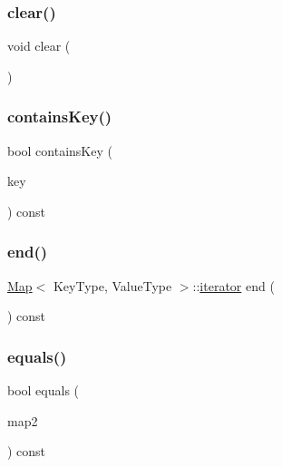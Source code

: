 \mbox{\label{classMap_ac8bb3912a3ce86b15842e79d0b421204}} 
\subsubsection{\texorpdfstring{clear()}{clear()}}
{\footnotesize\ttfamily void clear (\begin{DoxyParamCaption}{ }\end{DoxyParamCaption})}

\mbox{\label{classMap_a37473445b6725c5f0fc59a32ea2e645e}} 
\subsubsection{\texorpdfstring{contains\+Key()}{containsKey()}}
{\footnotesize\ttfamily bool contains\+Key (\begin{DoxyParamCaption}\item[{const Key\+Type \&}]{key }\end{DoxyParamCaption}) const}

\mbox{\label{classMap_a5b99f697823461ff62f22bd052079375}} 
\subsubsection{\texorpdfstring{end()}{end()}}
{\footnotesize\ttfamily \mbox{\hyperlink{classMap}{Map}}$<$ Key\+Type, Value\+Type $>$\+::\mbox{\hyperlink{classMap_ab3d10e70baaeac78e76b7abae7e2cf76}{iterator}} end (\begin{DoxyParamCaption}{ }\end{DoxyParamCaption}) const}

\mbox{\label{classMap_a91a1c833c72a288f2e2ea0207449513a}} 
\subsubsection{\texorpdfstring{equals()}{equals()}}
{\footnotesize\ttfamily bool equals (\begin{DoxyParamCaption}\item[{const \mbox{\hyperlink{classMap}{Map}}$<$ Key\+Type, Value\+Type $>$ \&}]{map2 }\end{DoxyParamCaption}) const}

